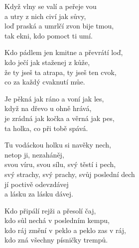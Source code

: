 
\vspace*{-2pt}

\ve{}
Když vlny se valí a peřeje vou\\
a utry z nich civí jak sůvy,\\
loď praská a umrlčí zvon bije tmou,\\
tak ekni, kdo pomoct ti umí. 

\vspace*{-1pt}

\re{*:}
Kdo pádlem jen kmitne a převrátí loď,\\
kdo ječí jak staženej z kůže,\\
že ty jseš ta atrapa, ty jseš ten cvok,\\
co za každý cvaknutí můe. 

\vspace*{-3pt}

\ve{}
Je pěkná jak ráno a voní jak les,\\
když na dřevo u ohně hrává,\\
je zrádná jak kočka a věrná jak pes,\\
ta holka, co při tobě spává.

\vspace*{-3pt}

\cho{}
Tu vodáckou holku si navěky nech,\\
netop ji, nezaháněj,\\
svou víru, svou sílu, svý těstí i pech,\\
svý strachy, svý prachy, svůj poslední dech\\
jí poctivě odevzdávej\\
a lásku za lásku dávej.

\vspace*{-2pt}
 
Kdo připálí rejži a přesolí čaj,\\
kdo sůl nechá v posledním kempu,\\
kdo ráj změní v peklo a peklo zas v ráj,\\
kdo zná všechny písničky trempů. 

